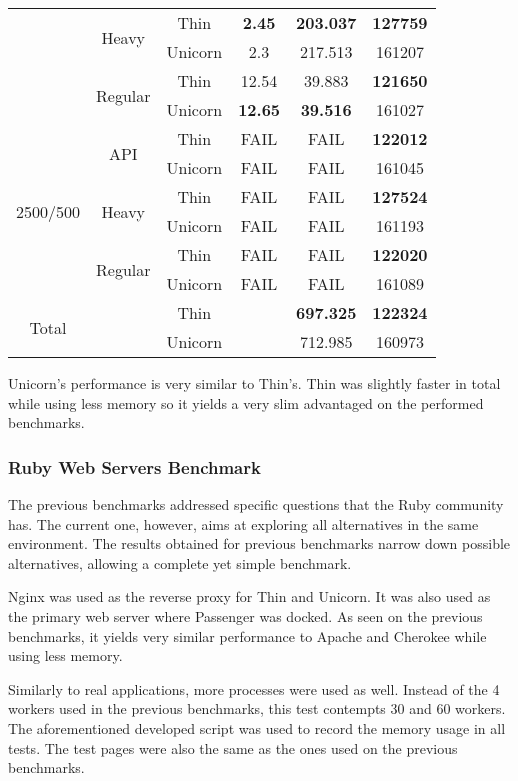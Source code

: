 \begin{table}[h!t]
\begin{tabular}{c|c|c|c|c|c}
     & \multirow{2}{*}{Heavy} & Thin & \textbf{2.45} & \textbf{203.037} & \textbf{127759}\\\cline{3-6}
     &  & Unicorn & 2.3 & 217.513 & 161207\\\cline{2-6}
     & \multirow{2}{*}{Regular} & Thin & 12.54 & 39.883 & \textbf{121650}\\\cline{3-6}
     &  & Unicorn & \textbf{12.65} & \textbf{39.516} & 161027\\\hline
    \multirow{6}{*}{2500/500} & \multirow{2}{*}{API} & Thin & FAIL & FAIL & \textbf{122012}\\\cline{3-6}
     &  & Unicorn & FAIL & FAIL & 161045\\\cline{2-6}
     & \multirow{2}{*}{Heavy} & Thin & FAIL & FAIL & \textbf{127524}\\\cline{3-6}
     &  & Unicorn & FAIL & FAIL & 161193\\\cline{2-6}
     & \multirow{2}{*}{Regular} & Thin & FAIL & FAIL & \textbf{122020}\\\cline{3-6}
     &  & Unicorn & FAIL & FAIL & 161089\\\hline
    \multirow{2}{*}{Total} &  & Thin &  & \textbf{697.325} & \textbf{122324}\\\cline{2-6}
     &  & Unicorn &  & 712.985 & 160973\\
  \end{tabular}
\end{table}

Unicorn's performance is very similar to Thin's. Thin was slightly faster in total while using less memory so it yields a very slim advantaged on the performed benchmarks.

\subsubsection{Ruby Web Servers Benchmark}
The previous benchmarks addressed specific questions that the Ruby community has. The current one, however, aims at exploring all alternatives in the same environment. The results obtained for previous benchmarks narrow down possible alternatives, allowing a complete yet simple benchmark. 

Nginx was used as the reverse proxy for Thin and Unicorn. It was also used as the primary web server where Passenger was docked. As seen on the previous benchmarks, it yields very similar performance to Apache and Cherokee while using less memory.

Similarly to real applications, more processes were used as well. Instead of the 4 workers used in the previous benchmarks, this test contempts 30 and 60 workers. The aforementioned developed script was used to record the memory usage in all tests. The test pages were also the same as the ones used on the previous benchmarks.

